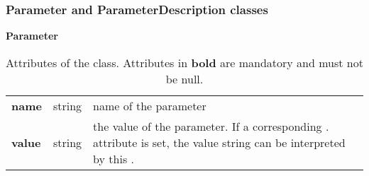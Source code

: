 \subsubsection{Parameter and ParameterDescription classes}
\label{sec:parameterandD}


\begin{table}[ht]
\small
{}\textwidth
 \textbf{\normalsize Parameter}\vspace{0.25em}\\
 \begin{tabulary}{1.0\textwidth}{llL}
 \toprule
  &    & \\
 \midrule
\textbf{name}  & string & name of the parameter \\
\textbf{value} & string & the value of the parameter. If a corresponding . attribute is set, the value string can be interpreted by this . \\
\bottomrule
\end{tabulary}
\caption[Attributes of the  class]{Attributes of the  class. Attributes in \textbf{bold} are mandatory and must not be null.}
\label{tab:param}
\end{table}

